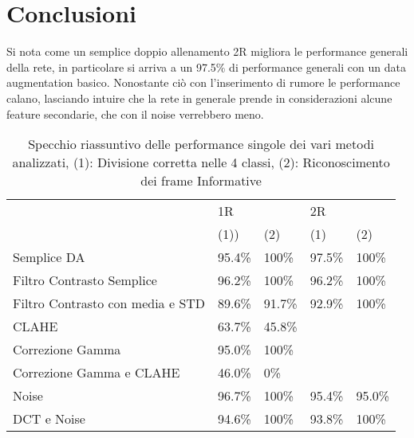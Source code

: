 \chapter{Conclusioni}\label{conclusioni}

Si nota come un semplice doppio allenamento 2R migliora  le performance generali della rete, in particolare si arriva a un 97.5\% di performance generali con un data augmentation basico. Nonostante ciò con l'inserimento di rumore le performance calano, lasciando intuire che la rete in generale prende in considerazioni alcune feature secondarie, che con il noise verrebbero meno.
\begin{table}[ht]
    \begin{tabular}{lllll}
                                     & \multicolumn{2}{l}{1R}                                                   & \multicolumn{2}{l}{2R}                                                   \\
                                     & (1)) & (2) & (1) & (2) \\
    Semplice DA                      & 95.4\%                            & 100\%                                & 97.5\%                            & 100\%                                \\
    Filtro Contrasto Semplice        & 96.2\%                            & 100\%                                & 96.2\%                            & 100\%                                \\
    Filtro Contrasto con media e STD & 89.6\%                            & 91.7\%                               & 92.9\%                            & 100\%                                \\
    CLAHE                            & 63.7\%                            & 45.8\%                               &                                   &                                      \\
    Correzione Gamma                 & 95.0\%                            & 100\%                                &                                   &                                      \\
    Correzione Gamma e CLAHE         & 46.0\%                            & 0\%                                  &                                   &                                      \\
    Noise                            & 96.7\%                            & 100\%                                & 95.4\%                            & 95.0\%                               \\
    DCT e Noise                      & 94.6\%                            & 100\%                                & 93.8\%                            & 100\%                               
    \end{tabular}
    \caption{Specchio riassuntivo delle performance singole dei vari metodi analizzati, (1): Divisione corretta nelle 4 classi, (2): Riconoscimento dei frame Informative}
    \label{tab:specchio-single}
\end{table}


